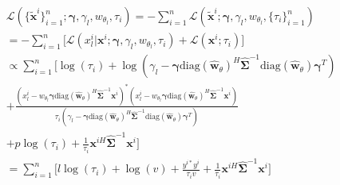     \begin{align*}
        &\mathcal{L}(\{\mathbf{\widetilde{x}}^i\}_{i=1}^n; \boldsymbol{\gamma}, \gamma_{l}, w_{\theta_{l}}, \tau_i) = - \sum_{i=1}^n \mathcal{L}(\mathbf{\widetilde{x}}^i; \boldsymbol{\gamma}, \gamma_{l}, w_{\theta_{l}}, \{\tau_i\}_{i=1}^n) \\
        & = - \sum_{i=1}^n \Bigg[ \mathcal{L}(x_{l}^i | \mathbf{x}^i; \boldsymbol{\gamma}, \gamma_{l}, w_{\theta_{l}}, \tau_i) + \mathcal{L}(\mathbf{x}^i; \tau_i) \Bigg] \\
        & \propto  \sum_{i=1}^n \Bigg[ \log(\tau_i) + \log( \gamma_l - \boldsymbol{\gamma} \text{diag}(\hat{\mathbf{w}}_{\theta})^H \hat{\mathbf{\Sigma}}^{-1} \text{diag}(\hat{\mathbf{w}}_{\theta}) \boldsymbol{\gamma}^T) \\
        & + \frac{(x_{l}^i - w_{\theta_{l}} \boldsymbol{\gamma} 
         \text{diag}(\hat{\mathbf{w}}_{\theta})^H \hat{\mathbf{\Sigma}}^{-1} \mathbf{x}^i)^*(x_{l}^i - w_{\theta_{l}} \boldsymbol{\gamma} \text{diag}(\hat{\mathbf{w}}_{\theta})^H \hat{\mathbf{\Sigma}}^{-1} \mathbf{x}^i)}{\tau_i (\gamma_l - \boldsymbol{\gamma} \text{diag}(\hat{\mathbf{w}}_{\theta})^H \hat{\mathbf{\Sigma}}^{-1} \text{diag}(\hat{\mathbf{w}}_{\theta}) \boldsymbol{\gamma}^T)} \\
        & + p \log(\tau_i) + \frac{1}{\tau_i} \mathbf{x}^{iH} \hat{\mathbf{\Sigma}}^{-1} \mathbf{x}^i \Bigg] \\
        & = \sum_{i=1}^n \Bigg[ l \log(\tau_i) + \log\left( v \right) + \frac{y^{i*} y^i}{\tau_i v} + \frac{1}{\tau_i} \mathbf{x}^{iH} \hat{\mathbf{\Sigma}}^{-1} \mathbf{x}^i \Bigg]
    \end{align*}
